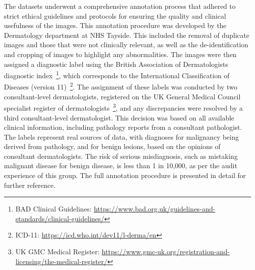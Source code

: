 The datasets underwent a comprehensive annotation process that adhered to strict ethical guidelines and protocols for ensuring the quality and clinical usefulness of the images. This annotation procedure was developed by the Dermatology department at NHS Tayside. This included the removal of duplicate images and those that were not clinically relevant, as well as the de-identification and cropping of images to highlight any abnormalities. The images were then assigned a diagnostic label using the British Association of Dermatologists diagnostic index~\footnote{BAD Clinical Guidelines: \url{https://www.bad.org.uk/guidelines-and-standards/clinical-guidelines/}}, which corresponds to the International Classification of Diseases (version 11)~\footnote{ICD-11: \url{https://icd.who.int/dev11/l-derma/en}}. The assignment of these labels was conducted by two consultant-level dermatologists, registered on the UK General Medical Council specialist register of dermatologists~\footnote{UK GMC Medical Register: \url{https://www.gmc-uk.org/registration-and-licensing/the-medical-register/}}, and any discrepancies were resolved by a third consultant-level dermatologist. This decision was based on all available clinical information, including pathology reports from a consultant pathologist. The labels represent real sources of data, with diagnoses for malignancy being derived from pathology, and for benign lesions, based on the opinions of consultant dermatologists. The risk of serious misdiagnosis, such as mistaking malignant disease for benign disease, is less than 1 in 10,000, as per the audit experience of this group. The full annotation procedure is presented in detail for further reference.

